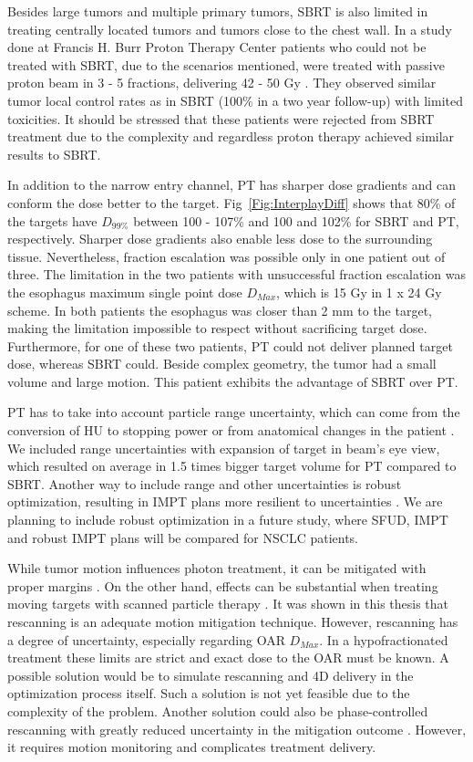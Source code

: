 \documentclass[type=dr, dr=rernat, accentcolor=tud7b,colorbacktitle, bigchapter, openright, twoside, 12pt ]{tudthesis}
\begin{document}
Besides large tumors and multiple primary tumors, SBRT is also limited in treating centrally located tumors and tumors close to the chest wall.
In a study done at Francis H. Burr Proton Therapy Center 
patients who could not be treated with SBRT, due to the scenarios mentioned, were treated with passive proton beam in 3 - 5 fractions, 
delivering 42 - 50 Gy \cite{Westover2012}. They observed similar tumor local control rates as in SBRT (100\% in a two year follow-up) with limited toxicities. 
It should be stressed that these patients were rejected from SBRT treatment due to the complexity and regardless proton therapy achieved similar results
to SBRT.

In addition to the narrow entry channel, PT has sharper dose gradients and can conform the dose better to the target. Fig~\ref{Fig:InterplayDiff} shows that 80\% of the targets have $D_{99\%}$
between 100 - 107\% and 100 and 102\% for SBRT and PT, respectively. Sharper dose gradients also enable less dose to the surrounding tissue. Nevertheless, fraction escalation
was possible only in one patient out of three. The limitation in the two patients with unsuccessful fraction escalation was the esophagus maximum single point dose $D_{Max}$, 
which is 15 Gy in 1 x 24 Gy scheme. In both patients the esophagus was closer than 2 mm to the target, making the limitation impossible to respect without sacrificing target dose.
Furthermore, for one of these two patients, PT could not deliver planned target dose, whereas SBRT could. Beside complex geometry, the tumor had a small volume and 
large motion. This patient exhibits the advantage of SBRT over PT.

PT has to take into account particle range uncertainty, which can come from the conversion of HU to stopping power \cite{Schneider1996}
or from anatomical changes in the patient \cite{Unkelbach2009}. We included range uncertainties with expansion of target in beam's eye view, which resulted on average in 1.5 times bigger
target volume for PT compared to SBRT. Another way to include range and other uncertainties is robust optimization, resulting in IMPT plans more resilient to uncertainties \cite{Unkelbach2009, Chen2012}.
We are planning to include robust optimization in a future study, where SFUD, IMPT and robust IMPT plans will be compared for NSCLC patients.

While tumor motion influences photon treatment, it can be mitigated with proper margins \cite{Zou2014}. 
On the other hand, effects can be substantial when treating moving targets with scanned particle therapy \cite{Bert2008}.
It was shown in this thesis that rescanning is an adequate motion mitigation technique. However, rescanning has a degree of uncertainty, 
especially regarding OAR $D_{Max}$.
In a hypofractionated treatment these limits are strict and exact dose to the OAR must be known. 
A possible solution would be to simulate rescanning and 4D delivery in the optimization process itself. 
Such a solution is not yet feasible due to the complexity of the problem. Another solution could also be phase-controlled rescanning with greatly reduced
uncertainty in the mitigation outcome \cite{Mori2013,Takahashi2014}. However,
it requires motion monitoring and complicates treatment delivery.
\end{document}
